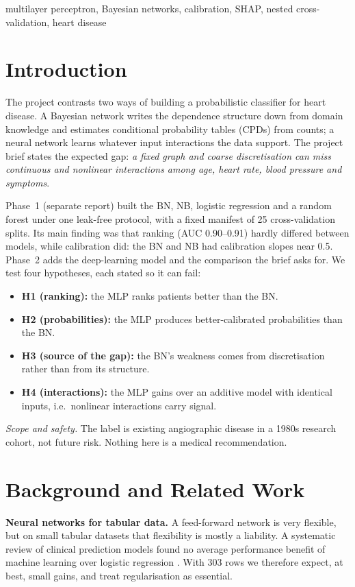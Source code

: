 \documentclass[conference]{IEEEtran}
\begin{document}
\begin{IEEEkeywords}
multilayer perceptron, Bayesian networks, calibration, SHAP, nested cross-validation, heart disease
\end{IEEEkeywords}

\section{Introduction}
The project contrasts two ways of building a probabilistic classifier for heart disease. A Bayesian network writes the dependence structure down from domain knowledge and estimates conditional probability tables (CPDs) from counts; a neural network learns whatever input interactions the data support. The project brief states the expected gap: \emph{a fixed graph and coarse discretisation can miss continuous and nonlinear interactions among age, heart rate, blood pressure and symptoms}.

Phase~1 (separate report) built the BN, NB, logistic regression and a random forest under one leak-free protocol, with a fixed manifest of 25 cross-validation splits. Its main finding was that ranking (AUC 0.90--0.91) hardly differed between models, while calibration did: the BN and NB had calibration slopes near 0.5. Phase~2 adds the deep-learning model and the comparison the brief asks for. We test four hypotheses, each stated so it can fail:
\begin{itemize}
\item \textbf{H1 (ranking):} the MLP ranks patients better than the BN.
\item \textbf{H2 (probabilities):} the MLP produces better-calibrated probabilities than the BN.
\item \textbf{H3 (source of the gap):} the BN's weakness comes from discretisation rather than from its structure.
\item \textbf{H4 (interactions):} the MLP gains over an additive model with identical inputs, i.e.\ nonlinear interactions carry signal.
\end{itemize}
\emph{Scope and safety.} The label is existing angiographic disease in a 1980s research cohort, not future risk. Nothing here is a medical recommendation.

\section{Background and Related Work}
\textbf{Neural networks for tabular data.} A feed-forward network is very flexible, but on small tabular datasets that flexibility is mostly a liability. A systematic review of clinical prediction models found no average performance benefit of machine learning over logistic regression \cite{christodoulou2019}. With 303 rows we therefore expect, at best, small gains, and treat regularisation as essential.
\end{document}
